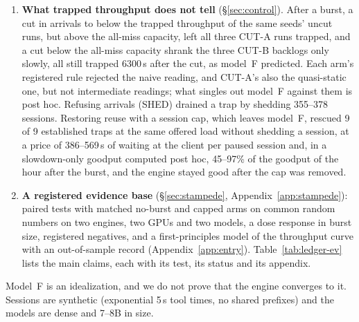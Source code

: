 \begin{enumerate}[label=(\arabic*),leftmargin=*]
four of the five pre-set scores; a per-run slope check failed in two of them.
A further blind test, MIRROR, with a step-capped
workload for which the theory predicts completions \emph{below} the all-miss capacity, passed at both rates: all six trapped
runs completed 0.50--0.845~$\lref$ over $[6600,8700)$\,s, against a measured 1.06~$\lref$.
\item \textbf{What trapped throughput does not tell} (\S\ref{sec:control}). After a burst, a cut in arrivals to below the trapped
throughput of the same seeds' uncut runs, but above the all-miss capacity, left all three CUT-A runs trapped, and a cut below the
all-miss capacity shrank the three CUT-B backlogs only slowly, all still trapped 6300\,s after the cut, as model~F predicted. Each
arm's registered rule rejected the naive reading, and CUT-A's also the quasi-static one, but not intermediate readings; what singles
out model~F against them is post hoc. Refusing arrivals (SHED) drained a trap by shedding 355--378 sessions. Restoring reuse with a
session cap, which leaves model~F, rescued 9 of 9 established traps at the same offered load without shedding a session, at
a price of 386--569\,s of waiting at the client per paused session and, in a slowdown-only goodput computed post hoc, 45--97\% of the goodput of the hour after the burst, and
the engine stayed good after the cap was removed.
\item \textbf{A registered evidence base} (\S\ref{sec:stampede}, Appendix~\ref{app:stampede}): paired tests with matched no-burst
and capped arms on common random numbers on two engines, two GPUs and two models, a dose response in burst size, registered
negatives, and a first-principles model of the throughput curve with an out-of-sample record (Appendix~\ref{app:entry}).
Table~\ref{tab:ledger-ev} lists the main claims, each with its test, its status and its appendix.
\end{enumerate}

\noindent Model~F is an idealization, and we do not prove that the engine converges to it. Sessions are synthetic (exponential
5\,s tool times, no shared prefixes) and the models are dense and 7--8B in size.

